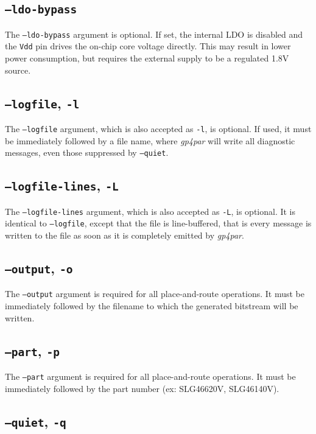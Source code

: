 \documentclass[11pt]{article}
\newcommand{\namestyle}[1]{\textit{#1}}
\newcommand{\tokenstyle}[1]{\texttt{#1}}
\begin{document}
\subsection{\texttt{--ldo-bypass}}

The \texttt{--ldo-bypass} argument is optional. If set, the internal LDO is disabled and the \tokenstyle{Vdd} pin drives the
on-chip core voltage directly. This may result in lower power consumption, but requires the external supply to be a regulated
1.8V source.

\subsection{\texttt{--logfile}, \texttt{-l}}

The \texttt{--logfile} argument, which is also accepted as \texttt{-l}, is optional. If used, it must be immediately
followed by a file name, where \namestyle{gp4par} will write all diagnostic messages, even those suppressed by
\texttt{--quiet}.

\subsection{\texttt{--logfile-lines}, \texttt{-L}}

The \texttt{--logfile-lines} argument, which is also accepted as \texttt{-L}, is optional. It is identical to
\texttt{--logfile}, except that the file is line-buffered, that is every message is written to the file as soon
as it is completely emitted by \namestyle{gp4par}.

\subsection{\texttt{--output}, \texttt{-o}}

The \texttt{--output} argument is required for all place-and-route operations. It must be immediately followed by the
filename to which the generated bitstream will be written.

\subsection{\texttt{--part}, \texttt{-p}}

The \texttt{--part} argument is required for all place-and-route operations. It must be immediately followed by the
part number (ex: SLG46620V, SLG46140V).

\subsection{\texttt{--quiet}, \texttt{-q}}
\end{document}
